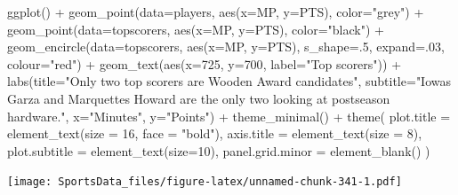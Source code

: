\documentclass[
]{book}
\newenvironment{Shaded}{\begin{snugshade}}{\end{snugshade}}
\newcommand{\AttributeTok}[1]{\textcolor[rgb]{0.77,0.63,0.00}{#1}}
\newcommand{\DecValTok}[1]{\textcolor[rgb]{0.00,0.00,0.81}{#1}}
\newcommand{\FunctionTok}[1]{\textcolor[rgb]{0.00,0.00,0.00}{#1}}
\newcommand{\NormalTok}[1]{#1}
\newcommand{\SpecialCharTok}[1]{\textcolor[rgb]{0.00,0.00,0.00}{#1}}
\newcommand{\StringTok}[1]{\textcolor[rgb]{0.31,0.60,0.02}{#1}}
\begin{document}
\begin{Shaded}
\begin{Highlighting}[]
\FunctionTok{ggplot}\NormalTok{() }\SpecialCharTok{+} 
  \FunctionTok{geom\_point}\NormalTok{(}\AttributeTok{data=}\NormalTok{players, }\FunctionTok{aes}\NormalTok{(}\AttributeTok{x=}\NormalTok{MP, }\AttributeTok{y=}\NormalTok{PTS), }\AttributeTok{color=}\StringTok{"grey"}\NormalTok{) }\SpecialCharTok{+} 
  \FunctionTok{geom\_point}\NormalTok{(}\AttributeTok{data=}\NormalTok{topscorers, }\FunctionTok{aes}\NormalTok{(}\AttributeTok{x=}\NormalTok{MP, }\AttributeTok{y=}\NormalTok{PTS), }\AttributeTok{color=}\StringTok{"black"}\NormalTok{) }\SpecialCharTok{+} 
  \FunctionTok{geom\_encircle}\NormalTok{(}\AttributeTok{data=}\NormalTok{topscorers, }\FunctionTok{aes}\NormalTok{(}\AttributeTok{x=}\NormalTok{MP, }\AttributeTok{y=}\NormalTok{PTS), }\AttributeTok{s\_shape=}\NormalTok{.}\DecValTok{5}\NormalTok{, }\AttributeTok{expand=}\NormalTok{.}\DecValTok{03}\NormalTok{, }\AttributeTok{colour=}\StringTok{"red"}\NormalTok{) }\SpecialCharTok{+}
  \FunctionTok{geom\_text}\NormalTok{(}\FunctionTok{aes}\NormalTok{(}\AttributeTok{x=}\DecValTok{725}\NormalTok{, }\AttributeTok{y=}\DecValTok{700}\NormalTok{, }\AttributeTok{label=}\StringTok{"Top scorers"}\NormalTok{)) }\SpecialCharTok{+} 
  \FunctionTok{labs}\NormalTok{(}\AttributeTok{title=}\StringTok{"Only two top scorers are Wooden Award candidates"}\NormalTok{, }\AttributeTok{subtitle=}\StringTok{"Iowa\textquotesingle{}s Garza and Marquette\textquotesingle{}s Howard are the only two looking at postseason hardware."}\NormalTok{, }\AttributeTok{x=}\StringTok{"Minutes"}\NormalTok{, }\AttributeTok{y=}\StringTok{"Points"}\NormalTok{) }\SpecialCharTok{+} 
  \FunctionTok{theme\_minimal}\NormalTok{() }\SpecialCharTok{+} 
  \FunctionTok{theme}\NormalTok{(}
    \AttributeTok{plot.title =} \FunctionTok{element\_text}\NormalTok{(}\AttributeTok{size =} \DecValTok{16}\NormalTok{, }\AttributeTok{face =} \StringTok{"bold"}\NormalTok{),}
    \AttributeTok{axis.title =} \FunctionTok{element\_text}\NormalTok{(}\AttributeTok{size =} \DecValTok{8}\NormalTok{), }
    \AttributeTok{plot.subtitle =} \FunctionTok{element\_text}\NormalTok{(}\AttributeTok{size=}\DecValTok{10}\NormalTok{), }
    \AttributeTok{panel.grid.minor =} \FunctionTok{element\_blank}\NormalTok{()}
\NormalTok{    )}
\end{Highlighting}
\end{Shaded}

\texttt{[image: SportsData\_files/figure-latex/unnamed-chunk-341-1.pdf]}
\end{document}

